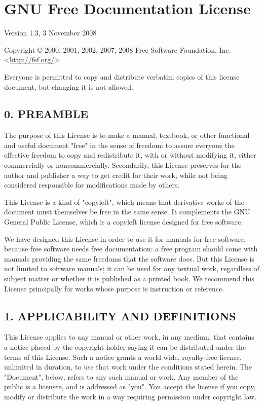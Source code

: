 \section*{GNU Free Documentation License}

Version 1.3, 3 November 2008

Copyright © 2000, 2001, 2002, 2007, 2008 Free Software Foundation, Inc. <\url{http://fsf.org/}> 

Everyone is permitted to copy and distribute verbatim copies of this license document, but changing it is not allowed.

\subsection*{0. PREAMBLE}



The purpose of this License is to make a manual, textbook, or other functional and useful document "free" in the sense of freedom: to assure everyone 
the effective freedom to copy and redistribute it, with or without modifying it, either commercially or noncommercially. Secondarily, this License 
preserves for the author and publisher a way to get credit for their work, while not being considered responsible for modifications made by others.

This License is a kind of "copyleft", which means that derivative works of the document must themselves be free in the same sense. It complements 
the GNU General Public License, which is a copyleft license designed for free software.

We have designed this License in order to use it for manuals for free software, because free software needs free documentation: a free program 
should come with manuals providing the same freedoms that the software does. But this License is not limited to software manuals; it can be used 
for any textual work, regardless of subject matter or whether it is published as a printed book. We recommend this License principally for works 
whose purpose is instruction or reference.




\subsection*{1. APPLICABILITY AND DEFINITIONS}

This License applies to any manual or other work, in any medium, that contains a notice placed by the copyright holder saying it can 
be distributed under the terms of this License. Such a notice grants a world-wide, royalty-free license, unlimited in duration, 
to use that work under the conditions stated herein. The "Document", below, refers to any such manual or work. Any member 
of the public is a licensee, and is addressed as "you". You accept the license if you copy, modify or distribute the work 
in a way requiring permission under copyright law.

